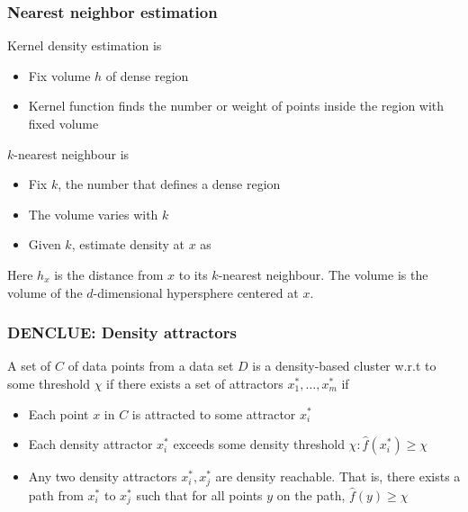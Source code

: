 \subsubsection{Nearest neighbor estimation}
    Kernel density estimation is
    \begin{itemize}
        \item Fix volume $h$ of dense region
        \item Kernel function finds the number or weight of points inside the region with fixed volume
    \end{itemize}
    $k$-nearest neighbour is
    \begin{itemize}
        \item Fix $k$, the number that defines a dense region
        \item The volume varies with $k$
        \item Given $k$, estimate density at $x$ as 
    \end{itemize}
    Here $h_x$ is the distance from $x$ to its $k$-nearest neighbour. The volume is the volume of the $d$-dimensional hypersphere centered at $x$. 
    
\subsubsection{DENCLUE: Density attractors}

A set of $C$ of data points from a data set $D$ is a density-based cluster w.r.t to some threshold $\chi$ if there exists a set of attractors $x_1^*, \dots, x_m^*$ if 
\begin{itemize}
    \item Each point $x$ in $C$ is attracted to some attractor $x_i^*$
    \item Each density attractor $x_i^*$ exceeds some density threshold $\chi : \hat{f}(x_i^*) \geq \chi$
    \item Any two density attractors $x_i^*, x_j^*$ are density reachable. That is, there exists a path from $x_i^*$ to $x_j^*$ such that for all points $y$ on the path, $\hat{f}(y) \geq \chi$
\end{itemize}

